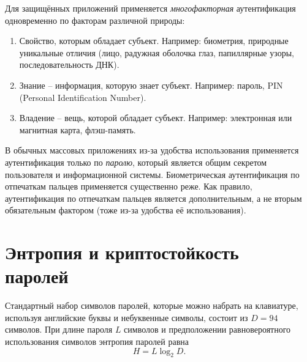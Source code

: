 Для защищённых приложений применяется \emph{многофакторная} аутентификация одновременно по факторам различной природы:
\begin{enumerate}
    \item Свойство, которым обладает субъект. Например: биометрия, природные уникальные отличия (лицо, радужная оболочка глаз, папиллярные узоры, последовательность ДНК).
    \item Знание -- информация, которую знает субъект. Например: пароль, PIN (Personal Identification Number).
    \item Владение -- вещь, которой обладает субъект. Например: электронная или магнитная карта, флэш-память.
\end{enumerate}

В обычных массовых приложениях из-за удобства использования применяется аутентификация только по \emph{паролю}, который является общим секретом пользователя и информационной системы. Биометрическая аутентификация по отпечаткам пальцев применяется существенно реже. Как правило, аутентификация по отпечаткам пальцев является дополнительным, а не вторым обязательным фактором (тоже из-за удобства её использования).



\section[Энтропия и криптостойкость паролей]{Энтропия и криптостойкость \protect\\ паролей}

Стандартный набор символов паролей, которые можно набрать на клавиатуре, используя английские буквы и небуквенные символы, состоит из $D=94$ символов. При длине пароля $L$ символов и предположении равновероятного использования символов энтропия паролей равна
    \[ H = L \log_2 D. \]

